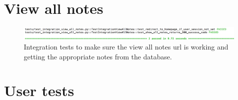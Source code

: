 \section{View all notes}
\begin{figure}[H]
  \centering
  \includegraphics[width=\textwidth]{images/test_integration_view_all_notes}
  \caption{Integration tests to make sure the view all notes url is working and getting the appropriate notes from the database.}
  \label{fig:integration_view_all_notes}
\end{figure}


\section{User tests}
